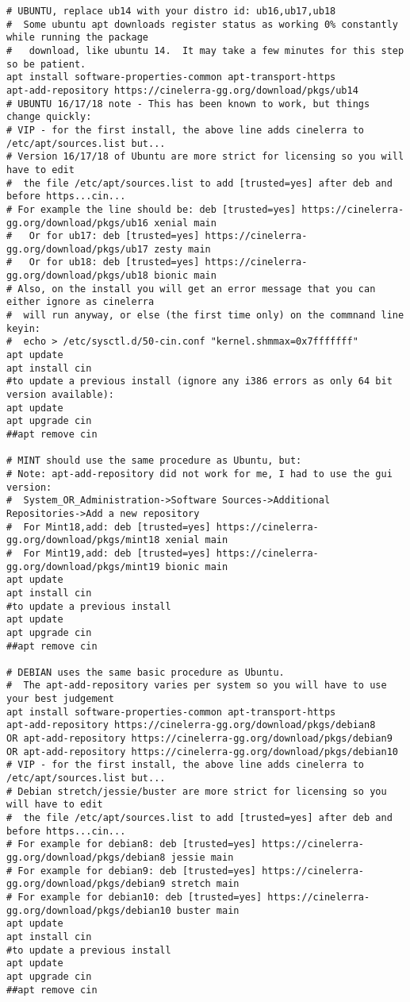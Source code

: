 \begin{lstlisting}[numbers=none]
# UBUNTU, replace ub14 with your distro id: ub16,ub17,ub18
#  Some ubuntu apt downloads register status as working 0% constantly while running the package
#   download, like ubuntu 14.  It may take a few minutes for this step so be patient.
apt install software-properties-common apt-transport-https
apt-add-repository https://cinelerra-gg.org/download/pkgs/ub14
# UBUNTU 16/17/18 note - This has been known to work, but things change quickly:
# VIP - for the first install, the above line adds cinelerra to /etc/apt/sources.list but...
# Version 16/17/18 of Ubuntu are more strict for licensing so you will have to edit
#  the file /etc/apt/sources.list to add [trusted=yes] after deb and before https...cin...
# For example the line should be: deb [trusted=yes] https://cinelerra-gg.org/download/pkgs/ub16 xenial main
#   Or for ub17: deb [trusted=yes] https://cinelerra-gg.org/download/pkgs/ub17 zesty main
#   Or for ub18: deb [trusted=yes] https://cinelerra-gg.org/download/pkgs/ub18 bionic main
# Also, on the install you will get an error message that you can either ignore as cinelerra
#  will run anyway, or else (the first time only) on the commnand line keyin: 
#  echo > /etc/sysctl.d/50-cin.conf "kernel.shmmax=0x7fffffff"
apt update
apt install cin
#to update a previous install (ignore any i386 errors as only 64 bit version available):
apt update
apt upgrade cin
##apt remove cin

# MINT should use the same procedure as Ubuntu, but: 
# Note: apt-add-repository did not work for me, I had to use the gui version:
#  System_OR_Administration->Software Sources->Additional Repositories->Add a new repository
#  For Mint18,add: deb [trusted=yes] https://cinelerra-gg.org/download/pkgs/mint18 xenial main
#  For Mint19,add: deb [trusted=yes] https://cinelerra-gg.org/download/pkgs/mint19 bionic main 
apt update
apt install cin
#to update a previous install
apt update
apt upgrade cin
##apt remove cin

# DEBIAN uses the same basic procedure as Ubuntu.
#  The apt-add-repository varies per system so you will have to use your best judgement
apt install software-properties-common apt-transport-https
apt-add-repository https://cinelerra-gg.org/download/pkgs/debian8
OR apt-add-repository https://cinelerra-gg.org/download/pkgs/debian9
OR apt-add-repository https://cinelerra-gg.org/download/pkgs/debian10
# VIP - for the first install, the above line adds cinelerra to /etc/apt/sources.list but...
# Debian stretch/jessie/buster are more strict for licensing so you will have to edit
#  the file /etc/apt/sources.list to add [trusted=yes] after deb and before https...cin...
# For example for debian8: deb [trusted=yes] https://cinelerra-gg.org/download/pkgs/debian8 jessie main
# For example for debian9: deb [trusted=yes] https://cinelerra-gg.org/download/pkgs/debian9 stretch main
# For example for debian10: deb [trusted=yes] https://cinelerra-gg.org/download/pkgs/debian10 buster main
apt update
apt install cin
#to update a previous install
apt update
apt upgrade cin
##apt remove cin


\end{lstlisting}
